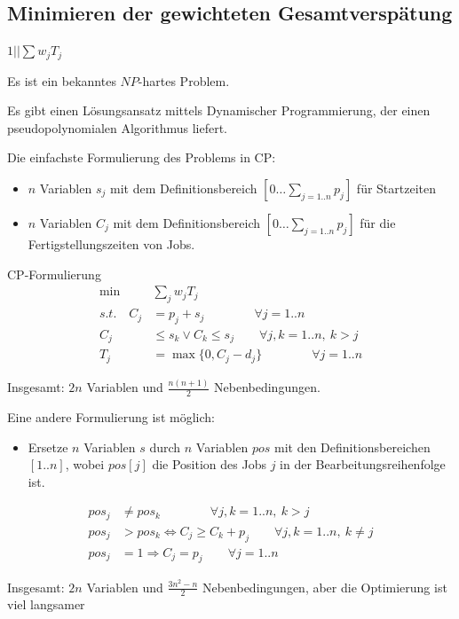 \documentclass[hyperref={pdfpagelabels=false}]{beamer}
\begin{document}
\subsection{Minimieren der gewichteten Gesamtverspätung}
\begin{frame}[allowframebreaks]{$1||\sum{w_jT_j}$}

Es ist ein bekanntes {\color{darkred}$NP$-hartes Problem}. 

\begin{block}{}
Es gibt einen Lösungsansatz mittels {\color{darkred}Dynamischer Programmierung}, der einen pseudopolynomialen Algorithmus liefert.
\end{block}
\vspace{10pt}
Die einfachste Formulierung des Problems in CP:
\begin{itemize}
\item $n$ Variablen $s_j$ mit dem Definitionsbereich $[0\dots \sum_{j=1..n}p_j]$ für Startzeiten
\item $n$ Variablen $C_j$ mit dem Definitionsbereich $[0\dots \sum_{j=1..n}p_j]$ für die Fertigstellungszeiten von Jobs.
\end{itemize}

\vspace{20pt}

\begin{block}{CP-Formulierung}
\begin{align}
 \min & \sum_{j}{w_jT_j} \nonumber \\
 s.t.\quad C_j & = p_j + s_j\qquad\qquad \forall j=1..n \nonumber \\
 C_j  & \le s_k \vee  C_k \le s_j \qquad \forall j,k=1..n,\ k>j \nonumber \\
 T_j & = \max\{0, C_j - d_j\} \qquad\qquad \forall j=1..n \nonumber
 \end{align}
\end{block}

Insgesamt: $2n$ Variablen und $\frac{n(n+1)}{2}$ Nebenbedingungen.

\newpage

Eine andere Formulierung ist möglich:
\begin{itemize}
\item Ersetze $n$ Variablen $s$ durch $n$ Variablen $pos$ mit den Definitionsbereichen $[1..n]$, wobei $pos[j]$ die Position des Jobs $j$ in der Bearbeitungsreihenfolge ist.
\end{itemize}
\begin{block}{} \begin{align}
	pos_j & \not= pos_k\qquad\qquad \forall j,k=1..n,\ k>j \nonumber \\
	pos_j  & > pos_k \Leftrightarrow  C_j \ge C_k + p_j \qquad \forall j,k=1..n,\ k\not=j \nonumber \\
	pos_j  & = 1 \Rightarrow C_j=p_j \qquad \forall j=1..n \nonumber
\end{align} \end{block}
Insgesamt: $2n$ Variablen und $\frac{3n^2-n}{2}$ Nebenbedingungen, aber die Optimierung ist viel langsamer


\end{frame}
\end{document}
